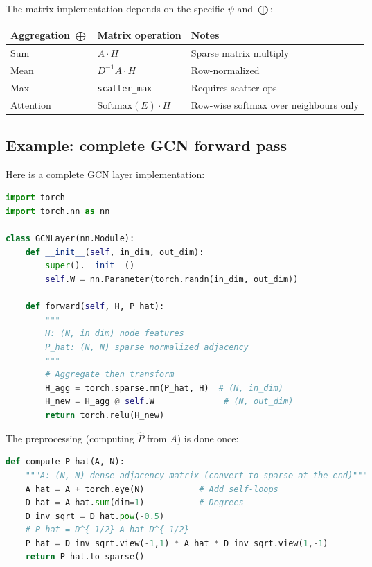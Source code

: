 \begin{notechapter}
The matrix implementation depends on the specific $\psi$ and $\bigoplus$:

\begin{center}
\renewcommand{\arraystretch}{1.3}
\begin{tabular}{lll}
\toprule
Aggregation $\bigoplus$ & Matrix operation & Notes \\
\midrule
Sum & $A \cdot H$ & Sparse matrix multiply \\
Mean & $D^{-1} A \cdot H$ & Row-normalized \\
Max & \texttt{scatter\_max} & Requires scatter ops \\
Attention & $\text{Softmax}(E) \cdot H$ & Row-wise softmax over neighbours only \\
\bottomrule
\end{tabular}
\end{center}

\subsection{Example: complete GCN forward pass}

\begin{example}
Here is a complete GCN layer implementation:

\begin{lstlisting}[language=Python]
import torch
import torch.nn as nn

class GCNLayer(nn.Module):
    def __init__(self, in_dim, out_dim):
        super().__init__()
        self.W = nn.Parameter(torch.randn(in_dim, out_dim))

    def forward(self, H, P_hat):
        """
        H: (N, in_dim) node features
        P_hat: (N, N) sparse normalized adjacency
        """
        # Aggregate then transform
        H_agg = torch.sparse.mm(P_hat, H)  # (N, in_dim)
        H_new = H_agg @ self.W              # (N, out_dim)
        return torch.relu(H_new)
\end{lstlisting}

The preprocessing (computing $\hat{P}$ from $A$) is done once:
\begin{lstlisting}[language=Python]
def compute_P_hat(A, N):
    """A: (N, N) dense adjacency matrix (convert to sparse at the end)"""
    A_hat = A + torch.eye(N)           # Add self-loops
    D_hat = A_hat.sum(dim=1)           # Degrees
    D_inv_sqrt = D_hat.pow(-0.5)
    # P_hat = D^{-1/2} A_hat D^{-1/2}
    P_hat = D_inv_sqrt.view(-1,1) * A_hat * D_inv_sqrt.view(1,-1)
    return P_hat.to_sparse()
\end{lstlisting}
\end{example}


\end{notechapter}
